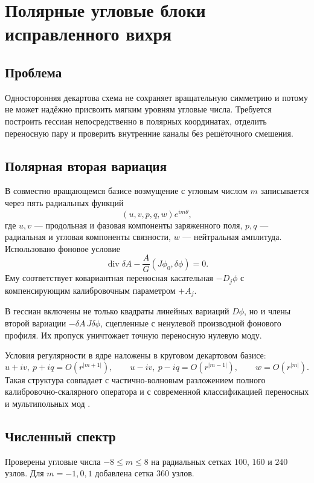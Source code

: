 \chapter{Полярные угловые блоки исправленного вихря}
\label{ch:v6-bosonic-defect-polar-angular-sturm-liouville-gate}

\section{Проблема}

Односторонняя декартова схема не сохраняет вращательную симметрию и потому
не может надёжно присвоить мягким уровням угловые числа. Требуется построить
гессиан непосредственно в полярных координатах, отделить переносную пару и
проверить внутренние каналы без решёточного смешения.

\section{Полярная вторая вариация}

В совместно вращающемся базисе возмущение с угловым числом $m$ записывается
через пять радиальных функций
\[
 (u,v,p,q,w)e^{im\theta},
\]
где $u,v$ --- продольная и фазовая компоненты заряженного поля, $p,q$ ---
радиальная и угловая компоненты связности, $w$ --- нейтральная амплитуда.
Использовано фоновое условие
\[
 \operatorname{div}\delta A-\frac{A}{G}(J\phi_0,\delta\phi)=0.
\]
Ему соответствует ковариантная переносная касательная $-D_j\phi$ с
компенсирующим калибровочным параметром $+A_j$.

В гессиан включены не только квадраты линейных вариаций $D\phi$, но и члены
второй вариации $-\delta A\,J\delta\phi$, сцепленные с ненулевой производной
фонового профиля. Их пропуск уничтожает точную переносную нулевую моду.

Условия регулярности в ядре наложены в круговом декартовом базисе:
\[
 u+iv,\ p+iq=O(r^{|m+1|}),\qquad
 u-iv,\ p-iq=O(r^{|m-1|}),\qquad
 w=O(r^{|m|}).
\]
Такая структура совпадает с частично-волновым разложением полного
калибровочно-скалярного оператора \cite{baacke-kevlishvili-partial-waves}
и с современной классификацией переносных и мультипольных мод
\cite{polar-alonso-vortex-spectrum}.

\section{Численный спектр}

Проверены угловые числа $-8\le m\le8$ на радиальных сетках $100$, $160$ и
$240$ узлов. Для $m=-1,0,1$ добавлена сетка $360$ узлов.

